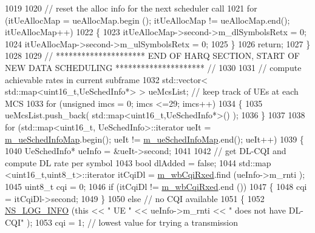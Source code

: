 \begin{DoxyCode}
1019 
1020                 \textcolor{comment}{// reset the alloc info for the next scheduler call}
1021                 \textcolor{keywordflow}{for} (itUeAllocMap = ueAllocMap.begin (); itUeAllocMap != ueAllocMap.end(); itUeAllocMap++)
1022                 \{
1023                         itUeAllocMap->second->m\_dlSymbolsRetx = 0;
1024                         itUeAllocMap->second->m\_ulSymbolsRetx = 0;
1025                 \}
1026                 \textcolor{keywordflow}{return};
1027         \}
1028 
1029         \textcolor{comment}{// ********************* END OF HARQ SECTION, START OF NEW DATA SCHEDULING ********************* //}
1030 
1031         \textcolor{comment}{// compute achievable rates in current subframe}
1032         std::vector< std::map<uint16\_t,UeSchedInfo*> > ueMcsList; \textcolor{comment}{// keep track of UEs at each MCS}
1033         \textcolor{keywordflow}{for} (\textcolor{keywordtype}{unsigned} imcs = 0; imcs <=29; imcs++)
1034         \{
1035                 ueMcsList.push\_back( std::map<uint16\_t,UeSchedInfo*>() );
1036         \}
1037 
1038         \textcolor{keywordflow}{for} (std::map<uint16\_t, UeSchedInfo>::iterator ueIt = \hyperlink{classns3_1_1MmWaveFlexTtiMaxRateMacScheduler_ac8359b3799f29f5b49e0f2dd52acd0ab}{m\_ueSchedInfoMap}.begin(); 
      ueIt != \hyperlink{classns3_1_1MmWaveFlexTtiMaxRateMacScheduler_ac8359b3799f29f5b49e0f2dd52acd0ab}{m\_ueSchedInfoMap}.end(); ueIt++)
1039         \{
1040                 UeSchedInfo* ueInfo = &ueIt->second;
1041 
1042                 \textcolor{comment}{// get DL-CQI and compute DL rate per symbol}
1043                 \textcolor{keywordtype}{bool} dlAdded = \textcolor{keyword}{false};
1044                 std::map <uint16\_t,uint8\_t>::iterator itCqiDl = \hyperlink{classns3_1_1MmWaveFlexTtiMaxRateMacScheduler_adf66188149ac6a56b4a58f742a27187b}{m\_wbCqiRxed}.find (ueInfo->m\_rnti
      );
1045                 uint8\_t cqi = 0;
1046                 \textcolor{keywordflow}{if} (itCqiDl != \hyperlink{classns3_1_1MmWaveFlexTtiMaxRateMacScheduler_adf66188149ac6a56b4a58f742a27187b}{m\_wbCqiRxed}.end ())
1047                 \{
1048                         cqi = itCqiDl->second;
1049                 \}
1050                 \textcolor{keywordflow}{else} \textcolor{comment}{// no CQI available}
1051                 \{
1052                         \hyperlink{group__logging_gafbd73ee2cf9f26b319f49086d8e860fb}{NS\_LOG\_INFO} (\textcolor{keyword}{this} << \textcolor{stringliteral}{" UE "} << ueInfo->m\_rnti << \textcolor{stringliteral}{" does not have DL-CQI"}
      );
1053                         cqi = 1; \textcolor{comment}{// lowest value for trying a transmission}

\end{DoxyCode}
